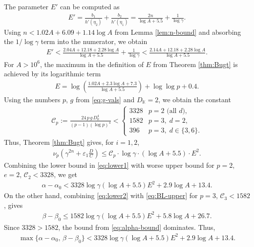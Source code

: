 \documentclass[11pt,a4paper]{article}
\numberwithin{equation}{section}
\numberwithin{table}{section}
\numberwithin{figure}{section}
\begin{document}
\medskip

The parameter $E'$ can be computed as 
\begin{align*}
	E' = \frac{b_1}{h'(\eta_2)}+\frac{b_2}{h'(\eta_1)}
	= \frac{2n}{\log A+5.5}+\frac{1}{\log\gamma}.
\end{align*}
Using $n < 1.02A + 6.09 + 1.14\log A$ from Lemma \ref{lem:n-bound} and absorbing the $1/\log\gamma$ term into the numerator, we obtain
\begin{align*}
	E' < \frac{2.04A + 12.18 + 2.28\log A}{\log A+5.5}+\frac{1}{\log\gamma}<\frac{2.14A + 12.18 + 2.28\log A}{\log A+5.5}.
\end{align*}
For $A > 10^6$, the maximum in the definition of $E$ from Theorem \ref{thm:Bugt} is achieved by its logarithmic term
\begin{align*}
	E = \log\!\left(\frac{1.02A+2.3\log A+7.3}{\log A+5.5}\right)+\log\log p+0.4.
\end{align*}
Using the numbers $p$, $g$ from \eqref{eq:g-vals} and $D_{\mathbb K}=2$, we obtain the constant
\begin{align*}
	\mathcal{C}_p:=\frac{24\,p\,g\,D_{\mathbb K}^4}{(p-1)(\log p)^4}
	< \begin{cases}
		3328 & p=2 \text{ (all } d\text{)},\\
		1582 & p=3,\; d=2,\\
		396 & p=3,\; d\in\{3,6\}.
	\end{cases}
\end{align*}
Thus, Theorem \ref{thm:Bugt} gives, for $i=1,2$,
\begin{align}\label{eq:BL-upper}
	\nu_{p}\!\left(\gamma^{2n}+\varepsilon_1\frac{D}{C}\right)
	\leq \mathcal{C}_p\cdot\log\gamma\cdot(\log A+5.5)\cdot E^2.
\end{align}
Combining the lower bound in \eqref{eq:lower1} with worse upper bound for $p=2$, $e=2$, $\mathcal{C}_2<3328$, we get
\begin{align}\label{eq:alpha-bound}
	\alpha-\alpha_0<3328\log\gamma(\log A+5.5)E^2+2.9\log A+13.4.
\end{align}
On the other hand, combining \eqref{eq:lower2} with \eqref{eq:BL-upper} for $p=3$,  $\mathcal{C}_3<1582$, gives
\begin{align*}
	\beta-\beta_0\le 1582\log\gamma(\log A+5.5)E^2+5.8\log A+26.7.
\end{align*}
Since $3328 > 1582$, the bound from \eqref{eq:alpha-bound} dominates. Thus,
\begin{align*}
	\max\{\alpha-\alpha_0,\,\beta-\beta_0\} <
	3328\log\gamma(\log A+5.5)E^2+2.9\log A+13.4.
\end{align*}
\end{document}
